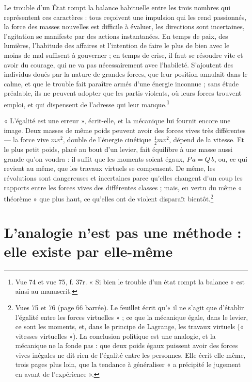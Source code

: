 \documentclass[11pt,a4paper]{article}
\begin{document}
Le trouble d'un État rompt la balance habituelle entre les trois nombres qui
représentent ces caractères : tous reçoivent une impulsion qui les rend
passionnés, la force des masses nouvelles est difficile à évaluer, les
directions sont incertaines, l'agitation se manifeste par des actions
instantanées. En temps de paix, des lumières, l'habitude des affaires et
l'intention de faire le plus de bien avec le moins de mal suffisent à
gouverner ; en temps de crise, il faut se résoudre vite et avoir du courage, qui
ne va pas nécessairement avec l'habileté. S'ajoutent des individus doués par la
nature de grandes forces, que leur position annulait dans le calme, et que le
trouble fait paraître armés d'une énergie inconnue ; sans étude préalable, ils
ne peuvent adopter que les partis violents, où leurs forces trouvent emploi, et
qui dispensent de l'adresse qui leur manque.\footnote{Vue 74 et vue 75, f. 37r.
« Si bien le trouble d'un état rompt la balance » est ainsi au manuscrit.}

« L'égalité est une erreur », écrit-elle, et la mécanique lui fournit encore une
image. Deux masses de même poids peuvent avoir des forces vives très
différentes — la force vive $mv^2$, double de l'énergie cinétique $\tfrac12 mv^2$,
dépend de la vitesse. Et le plus petit poids, placé au bout d'un levier, fait
équilibre à une masse aussi grande qu'on voudra : il suffit que les moments
soient égaux, $P\,a = Q\,b$, ou, ce qui revient au même, que les travaux
virtuels se compensent. De même, les révolutions sont dangereuses et
incertaines parce qu'elles changent d'un coup les rapports entre les forces vives
des différentes classes ; mais, en vertu du même « théorème » que plus haut, ce
qu'elles ont de violent disparaît bientôt.\footnote{Vues 75 et 76 (page 66
barrée). Le feuillet écrit qu'« il ne s'agit que d'établir l'égalité entre les
forces virtuelles » ; ce que la mécanique égale, dans le levier, ce sont les
moments, et, dans le principe de Lagrange, les travaux virtuels (« vitesses
virtuelles »). La conclusion politique est une analogie, et la mécanique ne la
fonde pas : que deux poids égaux puissent avoir des forces vives inégales ne dit
rien de l'égalité entre les personnes. Elle écrit elle-même, trois pages plus
loin, que la tendance à généraliser « a précipité le jugement en avant de
l'expérience ».}

\section*{L'analogie n'est pas une méthode : elle existe par elle-même}
\end{document}
